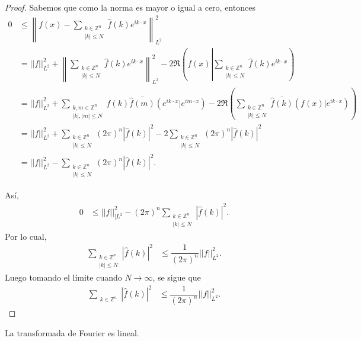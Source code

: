 \documentclass[12pt]{article}
\newcommand\Z{\ensuremath{\mathbb{Z}}}
\begin{document}
\begin{proof}
Sabemos que como la norma es mayor o igual a cero, entonces
\begin{align*}
0 &\leq\left\|f(x)-\sum_{\substack{k\in \Z^{n}\\ |k|\leq N}}\widehat{f}(k)e^{ik\cdot x}\right\|^{2}_{L^2}\\
&= || f||_{L^2}^{2}+ \left\| \sum_{\substack{k\in \Z^{n}\\|k|\leq N}} \widehat{f}(k)e^{ik\cdot x}\right\|_{L^2}^{2}- 2 \Re\left(f(x)\left|\sum_{\substack{k \in \Z^{n}\\ |k|\leq N}} \widehat{f}(k) e^{ik\cdot x}\right.\right)\\
&= || f||_{L^2}^{2}+ \sum_{\substack{k,m\in \Z^{n}\\ |k|,|m|\leq N}} \widehat{f}(k)\overline{\widehat{f}(m)}(e^{ik\cdot x}|e^{im\cdot x})- 2 \Re\left(\sum_{\substack{k \in \Z^{n}\\ |k|\leq N}} \overline{\widehat{f}(k)} \left(f(x) |e^{ik\cdot x}\right)\right)\\
&= || f||_{L^2}^{2}+ \sum_{\substack{k\in \Z^{n}\\ |k|\leq N}} (2\pi)^{n}\left|\widehat{f}(k)\right|^{2}-2 \sum_{\substack{k\in \Z^{n}\\ |k|\leq N}}(2\pi)^n\left|\widehat{f}(k)\right|^{2}\\
&= || f||_{L^2}^{2}- \sum_{\substack{k\in \Z^{n}\\ |k|\leq N}}(2\pi)^n\left|\widehat{f}(k)\right|^{2}.
\end{align*}

Así,
\begin{align*}
0 &\leq|| f||_{[L^2}^{2}-(2\pi)^n \sum_{\substack{k\in \Z^{n}\\ |k|\leq N}}\left|\widehat{f}(k)\right|^{2}.
\end{align*}
Por lo cual,
\begin{align*}
\sum_{\substack{k\in \Z^{n}\\ |k|\leq N}}\left|\widehat{f}(k)\right|^{2} &\leq\dfrac{1}{(2\pi)^n}|| f||_{L^2}^{2}.
\end{align*}
Luego tomando el límite cuando $N\rightarrow \infty$, se sigue que
\begin{align*}
\sum_{\substack{k\in \Z^{n}}}\left|\widehat{f}(k)\right|^{2} &\leq\dfrac{1}{(2\pi)^n}|| f||_{L^2}^{2}.
\end{align*}
\end{proof}

\begin{theorem}
La transformada de Fourier es lineal.
\end{theorem}
\end{document}
